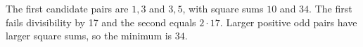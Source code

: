 The first candidate pairs are $1,3$ and $3,5$, with square sums $10$ and $34$. The first fails divisibility by 17 and the second equals $2\cdot17$. Larger positive odd pairs have larger square sums, so the minimum is $\boxed{34}$.
